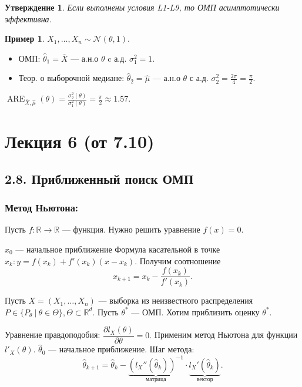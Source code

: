 \documentclass[12pt]{report}
\newtheorem{proposition}{Утверждение}
\theoremstyle{definition}
\newtheorem{example}{Пример}
\begin{document}
\begin{proposition}
	Если выполнены условия L1-L9, то ОМП асимптотически эффективна.
\end{proposition}
\begin{example}
	$X_1, \dots, X_n \sim \mathcal{N}(\theta, 1)$.
	\begin{itemize}
		\item ОМП: $\widehat{\theta}_1 = \overline{X}$ — а.н.о $\theta$ c а.д. $\sigma_1^2 = 1$.
		\item Теор. о выборочной медиане: $\widehat\theta_2 = \widehat{\mu}$ — а.н.о $\theta$ с а.д. $\sigma_2^2 = \frac{2\pi}{4} = \frac{\pi}{2}$.
	\end{itemize}
$\operatorname{ARE}_{\overline{X}, \widehat{\mu}}(\theta) = \frac{\sigma_2^2(\theta)}{\sigma_1^2(\theta)} = \frac{\pi}{2} \approx 1.57$.
\end{example}

\section{Лекция 6 (от 7.10)}
\subsection{2.8. Приближенный поиск ОМП}

\subsubsection{Метод Ньютона:}
Пусть $f: \mathbb{R} \rightarrow \mathbb{R}$ — функция. Нужно решить уравнение $f(x) = 0$.

$x_0$ — начальное приближение  
Формула касательной в точке $x_k: y = f(x_k) + f'(x_k)(x-x_k).$ Получим соотношение 
$$x_{k+1} = x_k - \dfrac{f(x_k)}{f'(x_k)}.$$

Пусть $X = (X_1, \dots, X_n)$ — выборка из неизвестного распределения $P \in \{P_\theta \ \vert \ \theta \in \Theta\}, \Theta \subset \mathbb{R}^d$. Пусть $\theta^*$ — ОМП. Хотим приблизить оценку $\theta^*$.

Уравнение правдоподобия: $\dfrac{\partial l_X(\theta)}{\partial \theta} = 0.$ Применим метод Ньютона для функции $l'_X(\theta)$.  
$\widehat{\theta}_0$ — начальное приближение. Шаг метода:
$$ \widehat{\theta}_{k+1} = \widehat{\theta}_k - \underbrace{(l_X''(\widehat{\theta}_k))^{-1}}_{матрица} \cdot \underbrace{l_X'(\widehat{\theta}_k)}_{вектор} .$$
\end{document}
